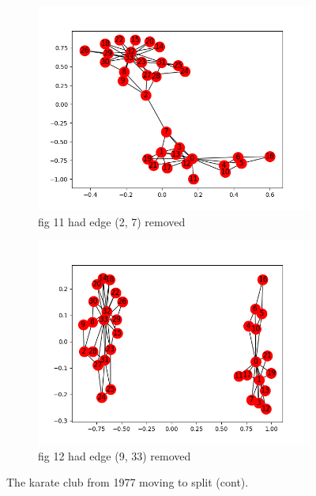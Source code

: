 \documentclass[10pt,letterpaper]{article}
\begin{document}
\begin{figure}[H]
\begin{subfigure}[b]{0.4\linewidth}
     \includegraphics[width=\linewidth]{karate11.png} 
     \caption{fig 11 had edge (2, 7) removed}
  \end{subfigure}
   \begin{subfigure}[b]{0.4\linewidth}
     \includegraphics[width=\linewidth]{karate12.png} 
     \caption{fig 12 had edge (9, 33) removed}
  \end{subfigure}
  \caption{The karate club from 1977 moving to split (cont).}
  \label{fig:kart2}
\end{figure}
 
\end{document}
